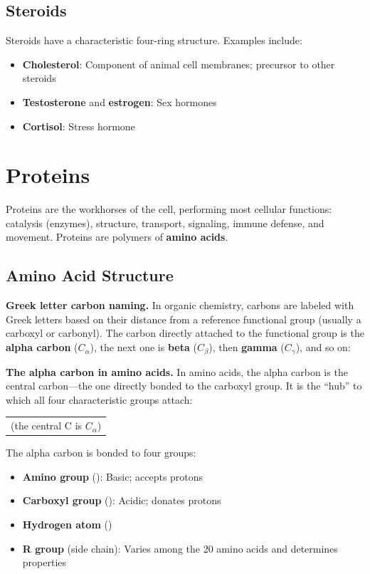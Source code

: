 \documentclass{report}
\begin{document}
\subsection{Steroids}

Steroids have a characteristic four-ring structure. Examples include:
\begin{itemize}
    \item \textbf{Cholesterol}: Component of animal cell membranes; precursor to other steroids
    \item \textbf{Testosterone} and \textbf{estrogen}: Sex hormones
    \item \textbf{Cortisol}: Stress hormone
\end{itemize}

\section{Proteins}

Proteins are the workhorses of the cell, performing most cellular functions: catalysis (enzymes), structure, transport, signaling, immune defense, and movement. Proteins are polymers of \textbf{amino acids}.

\subsection{Amino Acid Structure}

\textbf{Greek letter carbon naming.} In organic chemistry, carbons are labeled with Greek letters based on their distance from a reference functional group (usually a carboxyl or carbonyl). The carbon directly attached to the functional group is the \textbf{alpha carbon} (\(C_{\alpha}\)), the next one is \textbf{beta} (\(C_{\beta}\)), then \textbf{gamma} (\(C_{\gamma}\)), and so on:
\begin{center}
\end{center}

\textbf{The alpha carbon in amino acids.} In amino acids, the alpha carbon is the central carbon---the one directly bonded to the carboxyl group. It is the ``hub'' to which all four characteristic groups attach:
\begin{center}
\hspace{1cm}
\begin{tabular}{c}
\small (the central C is $C_\alpha$)
\end{tabular}
\end{center}
The alpha carbon is bonded to four groups:
\begin{itemize}
    \item \textbf{Amino group} (): Basic; accepts protons
    \item \textbf{Carboxyl group} (): Acidic; donates protons
    \item \textbf{Hydrogen atom} ()
    \item \textbf{R group} (side chain): Varies among the 20 amino acids and determines properties
\end{itemize}
\end{document}
